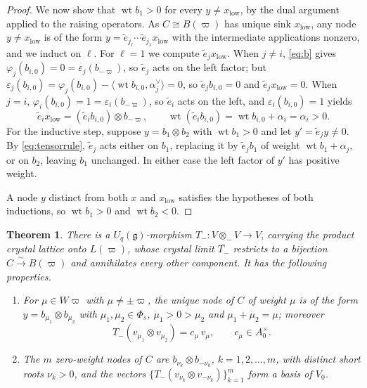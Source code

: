 \documentclass[12pt]{amsart}
\theoremstyle{plain}
\newtheorem{theorem}{Theorem}[section]
\theoremstyle{remark}
\newcommand{\g}{\mathfrak{g}}
\newcommand{\Uq}{U_q(\g)}
\newcommand{\wt}{\operatorname{wt}}
\newcommand{\ot}{\otimes}
\newcommand{\vp}{\varpi}
\newcommand{\Phis}{\Phi_{s}}
\begin{document}
\begin{proof}
We now show that $\wt b_1>0$ for every $y\neq x_{\mathrm{low}}$, by the dual
argument applied to the raising operators. As $C\cong B(\vp)$ has unique sink $x_{\mathrm{low}}$, any node $y\neq x_{\mathrm{low}}$ is of the form
$y=\tilde e_{j_\ell}\cdots\tilde e_{j_1}x_{\mathrm{low}}$ with the intermediate
applications nonzero, and we induct on $\ell$. For $\ell=1$ we compute $\tilde e_j
x_{\mathrm{low}}$. When $j\neq i$, \eqref{eq:b} gives
$\varphi_j(b_{i,0})=0=\varepsilon_j(b_{-\vp})$, so $\tilde e_j$ acts on the left factor;
but $\varepsilon_j(b_{i,0})=\varphi_j(b_{i,0})-\langle\wt b_{i,0},\alpha_j^\vee\rangle=0$, so $\tilde e_j
b_{i,0}=0$ and $\tilde e_j x_{\mathrm{low}}=0$. When $j=i$,
$\varphi_i(b_{i,0})=1=\varepsilon_i(b_{-\vp})$, so $\tilde e_i$ acts on the left, and
$\varepsilon_i(b_{i,0})=1$ yields
\[
\tilde e_i x_{\mathrm{low}}=(\tilde e_i b_{i,0})\ot b_{-\vp},\qquad
\wt(\tilde e_i b_{i,0})=\wt b_{i,0}+\alpha_i=\alpha_i>0.
\]
For the inductive step, suppose $y=b_1\ot b_2$ with $\wt b_1>0$ and let $y'=\tilde
e_j y\neq0$. By \eqref{eq:tensorrule}, $\tilde e_j$ acts either on $b_1$, replacing
it by $\tilde e_j b_1$ of weight $\wt b_1+\alpha_j$, or on $b_2$, leaving $b_1$
unchanged. In either case the left factor of $y'$ has positive weight.

A node $y$ distinct from both $x$ and $x_{\mathrm{low}}$ satisfies the hypotheses of
both inductions, so $\wt b_1>0$ and $\wt b_2<0$.
\end{proof}

\begin{theorem}\label{thm:Tminus}
There is a $\Uq$-morphism $T_-\colon V\ot_- V\to V$, carrying the product crystal lattice
onto $L(\vp)$, whose crystal limit $\overline{T_-}$ restricts to a bijection
$C\xrightarrow{\sim}B(\vp)$ and annihilates every other component. It has the
following properties.
\begin{enumerate}
\item[\rm(i)] For $\mu\in W\vp$ with $\mu\neq\pm\vp$, the unique node of $C$ of
weight $\mu$ is of the form $y=b_{\mu_1}\ot b_{\mu_2}$ with $\mu_1,\mu_2\in\Phis$,
$\mu_1>0>\mu_2$ and $\mu_1+\mu_2=\mu$; moreover
\[
T_-(v_{\mu_1}\ot v_{\mu_2})=c_\mu\,v_\mu,\qquad c_\mu\in A_0^\times.
\]
\item[\rm(ii)] The $m$ zero-weight nodes of $C$ are $b_{\nu_k}\ot b_{-\nu_k}$,
$k=1,2,\dots,m$, with distinct short roots $\nu_k>0$, and the vectors
$\{T_-(v_{\nu_k}\ot v_{-\nu_k})\}_{k=1}^m$ form a basis of $V_0$.
\end{enumerate}
\end{theorem}
\end{document}
